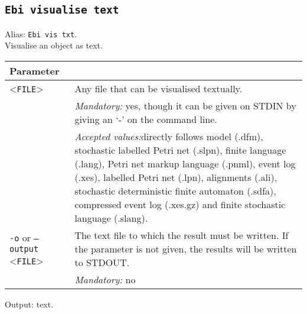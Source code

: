 {\subsection{\texttt{Ebi visualise text}}
\label{command:Ebi visualise text}
Alias: \texttt{Ebi vis txt}.\\
Visualise an object as text.\\
\begin{tabularx}{\linewidth}{lX}
\toprule
Parameter \\\midrule
<\texttt{FILE}>&Any file that can be visualised textually.\\
&\textit{Mandatory:} \quad yes, though it can be given on STDIN by giving an `-' on the command line.\\
&\textit{Accepted values:}\quad directly follows model (.dfm), stochastic labelled Petri net (.slpn), finite language (.lang), Petri net markup language (.pnml), event log (.xes), labelled Petri net (.lpn), alignments (.ali), stochastic deterministic finite automaton (.sdfa), compressed event log (.xes.gz) and finite stochastic language (.slang).\\
\texttt{-o} or \texttt{--output} <\texttt{FILE}> &
The text file to which the result must be written. If the parameter is not given, the results will be written to STDOUT.\\
&\textit{Mandatory:} \quad no\\
\bottomrule
\end{tabularx}
Output: text.
}
